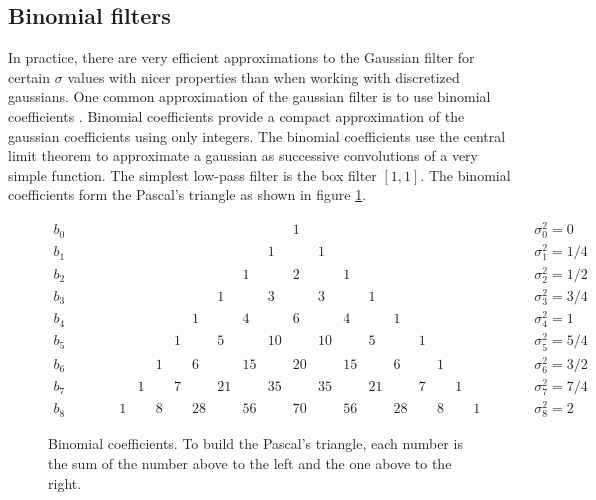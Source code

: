 \subsection{Binomial filters}

In practice, there are very efficient approximations to the Gaussian filter for certain $\sigma$ values with nicer properties than when working with discretized gaussians. One common approximation of the gaussian filter is to use binomial coefficients \cite{canny,Chehikian}. Binomial coefficients provide a compact approximation of the gaussian coefficients using only integers. The binomial coefficients use the central limit theorem to approximate a gaussian as successive convolutions of a very simple function. The simplest low-pass filter is the box filter $\left[1,1\right]$. The binomial coefficients form the Pascal's triangle as shown in figure \ref{fig:pascaltriangle}.

\begin{figure}[h]
\centerline{
$\begin{array}{ccccccccccccccccccccccccl} 
b_0 &  ~ &  ~&  ~ &  ~ & ~ & ~ & ~ & ~ & ~ & ~ & ~ & 1 & ~ & ~ & ~ & ~ & ~ & ~ & ~ & ~  & ~ &  ~ &  ~& \sigma_0^2=0\\
b_1 &  ~ &  ~&  ~ &  ~ & ~ & ~ & ~ & ~ & ~ & ~ & 1 & ~ & 1 & ~ & ~ & ~ & ~ & ~ & ~ & ~ & ~ &  ~ &  ~& \sigma_1^2=1/4\\
b_2 &  ~ &  ~&  ~ &  ~ & ~ & ~ & ~ & ~ & ~ & 1 & ~ & 2 & ~ & 1 & ~ & ~ & ~ & ~ & ~ & ~ & ~ &  ~ &  ~& \sigma_2^2=1/2\\
b_3 &  ~ &  ~&  ~ &  ~ & ~ & ~ & ~ & ~ & 1 & ~ & 3 & ~ & 3 & ~ & 1 & ~ & ~ & ~ & ~ & ~ & ~ &  ~ &  ~& \sigma_3^2=3/4\\
b_4 &  ~ &  ~&  ~ &  ~ & ~ & ~ & ~ & 1 & ~ & 4 & ~ &  6 & ~  & 4 & ~ & 1 & ~ & ~ & ~ & ~ & ~ &  ~ &  ~& \sigma_4^2=1\\
b_5 &  ~ &  ~&  ~ &  ~ & ~  & ~ & 1 & ~   & 5   & ~   &10  &  ~  & 10 & ~   & 5   & ~   & 1 & ~ & ~ & ~ & ~ &  ~ &  ~& \sigma_5^2=5/4\\
b_6 &  ~ &  ~&  ~ &  ~ & ~  & 1 & ~ & 6   & ~   & 15 & ~   & 20 & ~   & 15 & ~   & 6   & ~ & 1 & ~ & ~ & ~ &  ~ &  ~& \sigma_6^2=3/2\\
b_7 &  ~ &  ~&  ~ &  ~ &  1 & ~ & 7 & ~   & 21 & ~   & 35 & ~   & 35 & ~   & 21 & ~   & 7 & ~ & 1 & ~ & ~ &  ~ &  ~& \sigma_7^2=7/4\\
b_8 &  ~ &  ~&  ~ &  1 & ~  & 8 & ~ & 28 & ~   & 56 & ~   & 70 & ~   & 56 & ~   & 28 & ~ & 8 & ~ & 1 & ~ &  ~ &  ~& \sigma_8^2=2
\end{array}$
}
\caption{Binomial coefficients. To build the Pascal's triangle, each number is the sum of the number above to the left and the one above to the right.} 
\label{fig:pascaltriangle}
\end{figure}

